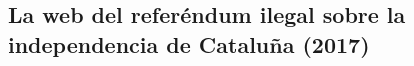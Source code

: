 \documentclass[12pt]{article} %
\begin{document}

\subsection{La web del referéndum ilegal sobre la independencia de Cataluña (2017)} %
\label{sub:la_web_del_referéndum_catalán_de_2017}




\newpage
\printbibliography
\end{document}
